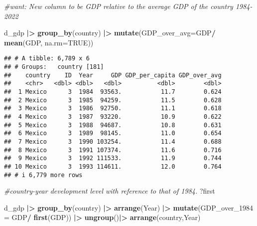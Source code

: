 \documentclass[
]{article}
\newenvironment{Shaded}{\begin{snugshade}}{\end{snugshade}}
\newcommand{\AttributeTok}[1]{\textcolor[rgb]{0.13,0.29,0.53}{#1}}
\newcommand{\CommentTok}[1]{\textcolor[rgb]{0.56,0.35,0.01}{\textit{#1}}}
\newcommand{\ConstantTok}[1]{\textcolor[rgb]{0.56,0.35,0.01}{#1}}
\newcommand{\FunctionTok}[1]{\textcolor[rgb]{0.13,0.29,0.53}{\textbf{#1}}}
\newcommand{\NormalTok}[1]{#1}
\newcommand{\SpecialCharTok}[1]{\textcolor[rgb]{0.81,0.36,0.00}{\textbf{#1}}}
\begin{document}
\begin{Shaded}
\begin{Highlighting}[]
\CommentTok{\#want: New column to be GDP relative to the average GDP of the country 1984{-}2022}

\NormalTok{d\_gdp }\SpecialCharTok{|\textgreater{}} 
  \FunctionTok{group\_by}\NormalTok{(country) }\SpecialCharTok{|\textgreater{}}
\FunctionTok{mutate}\NormalTok{(}\AttributeTok{GDP\_over\_avg=}\NormalTok{GDP}\SpecialCharTok{/} \FunctionTok{mean}\NormalTok{(GDP, }\AttributeTok{na.rm=}\ConstantTok{TRUE}\NormalTok{))}
\end{Highlighting}
\end{Shaded}

\begin{verbatim}
## # A tibble: 6,789 x 6
## # Groups:   country [181]
##    country    ID  Year     GDP GDP_per_capita GDP_over_avg
##    <chr>   <dbl> <dbl>   <dbl>          <dbl>        <dbl>
##  1 Mexico      3  1984  93563.           11.7        0.624
##  2 Mexico      3  1985  94259.           11.5        0.628
##  3 Mexico      3  1986  92750.           11.1        0.618
##  4 Mexico      3  1987  93220.           10.9        0.622
##  5 Mexico      3  1988  94687.           10.8        0.631
##  6 Mexico      3  1989  98145.           11.0        0.654
##  7 Mexico      3  1990 103254.           11.4        0.688
##  8 Mexico      3  1991 107374.           11.6        0.716
##  9 Mexico      3  1992 111533.           11.9        0.744
## 10 Mexico      3  1993 114611.           12.0        0.764
## # i 6,779 more rows
\end{verbatim}

\begin{Shaded}
\begin{Highlighting}[]
\CommentTok{\#country{-}year development level with reference to that of 1984.}
\NormalTok{?first}
\end{Highlighting}
\end{Shaded}

\begin{Shaded}
\begin{Highlighting}[]
\NormalTok{d\_gdp }\SpecialCharTok{|\textgreater{}}
  \FunctionTok{group\_by}\NormalTok{(country) }\SpecialCharTok{|\textgreater{}}
  \FunctionTok{arrange}\NormalTok{(Year) }\SpecialCharTok{|\textgreater{}}
  \FunctionTok{mutate}\NormalTok{(}\AttributeTok{GDP\_over\_1984 =}\NormalTok{ GDP}\SpecialCharTok{/} \FunctionTok{first}\NormalTok{(GDP)) }\SpecialCharTok{|\textgreater{}}
  \FunctionTok{ungroup}\NormalTok{()}\SpecialCharTok{|\textgreater{}}
  \FunctionTok{arrange}\NormalTok{(country,Year)}
\end{Highlighting}
\end{Shaded}
\end{document}
